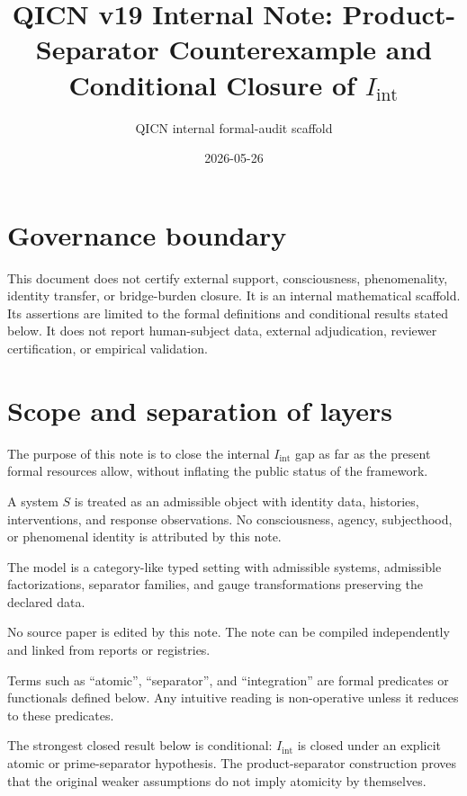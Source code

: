 \documentclass[11pt]{article}
\title{QICN v19 Internal Note: Product-Separator Counterexample and Conditional Closure of \texorpdfstring{$I_{\mathrm{int}}$}{I_int}}
\author{QICN internal formal-audit scaffold}
\date{2026-05-26}
\newcommand{\Iint}{I_{\mathrm{int}}}
\begin{document}
\maketitle

\section*{Governance boundary}
This document does not certify external support, consciousness, phenomenality, identity transfer, or bridge-burden closure. It is an internal mathematical scaffold. Its assertions are limited to the formal definitions and conditional results stated below. It does not report human-subject data, external adjudication, reviewer certification, or empirical validation.

\section{Scope and separation of layers}
The purpose of this note is to close the internal $\Iint$ gap as far as the present formal resources allow, without inflating the public status of the framework.

\begin{description}[leftmargin=2.6cm]
  \item[Ontology.] A system $S$ is treated as an admissible object with identity data, histories, interventions, and response observations. No consciousness, agency, subjecthood, or phenomenal identity is attributed by this note.
  \item[Mathematical model.] The model is a category-like typed setting with admissible systems, admissible factorizations, separator families, and gauge transformations preserving the declared data.
  \item[Implementation.] No source paper is edited by this note. The note can be compiled independently and linked from reports or registries.
  \item[Language.] Terms such as ``atomic'', ``separator'', and ``integration'' are formal predicates or functionals defined below. Any intuitive reading is non-operative unless it reduces to these predicates.
  \item[Interpretation.] The strongest closed result below is conditional: $\Iint$ is closed under an explicit atomic or prime-separator hypothesis. The product-separator construction proves that the original weaker assumptions do not imply atomicity by themselves.
\end{description}
\end{document}
